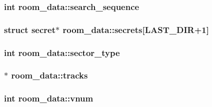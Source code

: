 \hypertarget{structroom__data_aecb36bedf2a3d19b76182ae6f53ed707}{
\subsubsection[{search\-\_\-sequence}]{\setlength{\rightskip}{0pt plus 5cm}int room\-\_\-data\-::search\-\_\-sequence}}\label{structroom__data_aecb36bedf2a3d19b76182ae6f53ed707}
\hypertarget{structroom__data_a510a214502c552df4cd150fb29cd7494}{
\subsubsection[{secrets}]{\setlength{\rightskip}{0pt plus 5cm}struct {\bf secret}$\ast$ room\-\_\-data\-::secrets\mbox{[}{\bf L\-A\-S\-T\-\_\-\-D\-I\-R}+1\mbox{]}}}\label{structroom__data_a510a214502c552df4cd150fb29cd7494}
\hypertarget{structroom__data_adcba259049bfe3580ddba8f5ec8f14aa}{
\subsubsection[{sector\-\_\-type}]{\setlength{\rightskip}{0pt plus 5cm}int room\-\_\-data\-::sector\-\_\-type}}\label{structroom__data_adcba259049bfe3580ddba8f5ec8f14aa}
\hypertarget{structroom__data_a7712c20f923e067a93fa9c63ea79eb62}{
\subsubsection[{tracks}]{$\ast$ room\-\_\-data\-::tracks}}\label{structroom__data_a7712c20f923e067a93fa9c63ea79eb62}
\hypertarget{structroom__data_a1da0540f0aa7691a1f0083cfa2c5503e}{
\subsubsection[{vnum}]{\setlength{\rightskip}{0pt plus 5cm}int room\-\_\-data\-::vnum}}\label{structroom__data_a1da0540f0aa7691a1f0083cfa2c5503e}

